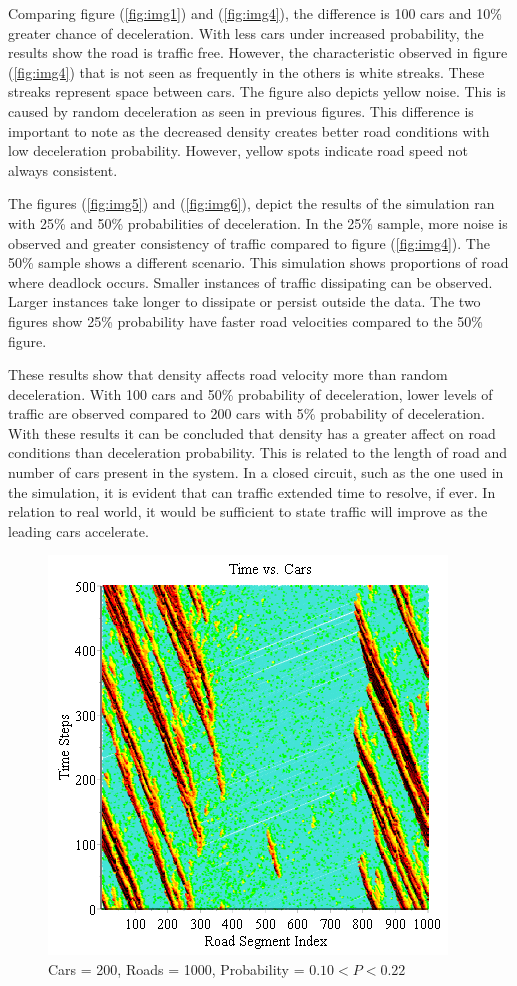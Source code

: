 \documentclass[12pt]{extarticle}
\begin{document}
Comparing figure (\ref{fig:img1}) and (\ref{fig:img4}), the difference is 100 cars and 10\% greater chance of deceleration. With less cars under increased probability, the results show the road is traffic free. However, the characteristic observed in figure (\ref{fig:img4}) that is not seen as frequently in the others is white streaks. These streaks represent space between cars. The figure also depicts yellow noise. This is caused by random deceleration as seen in previous figures. This difference is important to note as the decreased density creates better road conditions with low deceleration probability. However, yellow spots indicate road speed not always consistent.

The figures (\ref{fig:img5}) and (\ref{fig:img6}), depict the results of the simulation ran with 25\% and 50\% probabilities of deceleration. In the 25\% sample, more noise is observed and greater consistency of traffic compared to figure (\ref{fig:img4}). The 50\% sample shows a different scenario. This simulation shows proportions of road where deadlock occurs. Smaller instances of traffic dissipating can be observed. Larger instances take longer to dissipate or persist outside the data. The two figures show 25\% probability have faster road velocities compared to the 50\% figure. 

These results show that density affects road velocity more than random deceleration. With 100 cars and 50\% probability of deceleration, lower levels of traffic are observed compared to 200 cars with 5\% probability of deceleration. With these results it can be concluded that density has a greater affect on road conditions than deceleration probability. This is related to the length of road and number of cars present in the system. In a closed circuit, such as the one used in the simulation, it is evident that can traffic extended time to resolve, if ever. In relation to real world, it would be sufficient to state traffic will improve as the leading cars accelerate. 
\begin{figure}
	\includegraphics[scale=0.50]{Graph7.png}
	\caption{Cars = 200, Roads = 1000, \newline Probability = $0.10 < P < 0.22$}
	\label{fig:img7}
\end{figure}
\end{document}
